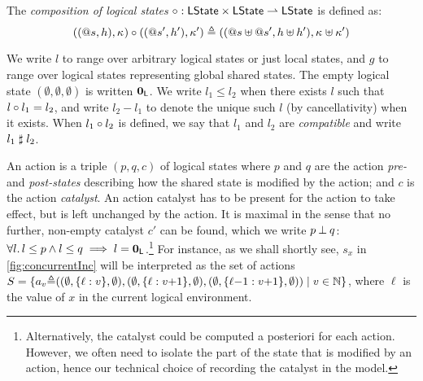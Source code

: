 \begin{definition}
  The \emph{composition of logical states} $ \circ : \mathsf{LState}
  \times \mathsf{LState} \rightharpoonup \mathsf{LState} $ is defined
  as:
  \[
  ((@s, h),\kappa_{}) \circ ((@s', h'), \kappa_{}') \triangleq
  ((@s\uplus @s', h\uplus h'), \kappa_{}\uplus \kappa_{}')
  \]
\end{definition}

We write $l$ to range over arbitrary logical states or just
local states, and $g$ to range over logical states representing global
shared states. The empty logical state $(\emptyset, \emptyset, \emptyset)$ is
written $\mathbf{0}_{\mathsf{L}}$. We write $l_1 \leq l_2$ when there exists $l$ such
that $l\circ l_1 = l_2$, and write $l_2 - l_1$ to denote the
unique such $l$ (by cancellativity) when it exists. When $l_1\circ
l_2$ is defined, we say that $l_1$ and $l_2$ are \emph{compatible} and
write $l_1\mathrel{\sharp} l_2$.

An action is a triple $(p, q, c)$ of logical states where $p$ and $q$
are the action \emph{pre-} and \emph{post-states} describing how the
shared state is modified by the action; and $c$ is the action
\emph{catalyst}. An action catalyst has to be present for the action
to take effect, but is left unchanged by the action. It is maximal in
the sense that no further, non-empty catalyst $c'$ can be found, which
we write $p \mathbin{\bot} q$: $\forall l.\, l \leq p \land l \leq q
\implies l = \mathbf{0}_{\mathsf{L}}$.\footnote{Alternatively, the catalyst could be
  computed a posteriori for each action.  However, we often need to
  isolate the part of the state that is modified by an action, hence
  our technical choice of recording the catalyst in the model.}  For
instance, \label{ex:sxsem} as we shall shortly see, $s_x$ in
\fig\ref{fig:concurrentInc} will be interpreted as the set of actions
$S=\{a_v{\triangleq}((\emptyset, \{\ell:v\}, \emptyset), (\emptyset,
\{\ell:v{+}1\}, \emptyset), (\emptyset, \{\ell{-}1:v{+}1\},
\emptyset))\mid v \in \mathbb{N}\}$, where $\ell$ is the value of $x$ in
the current logical environment.

